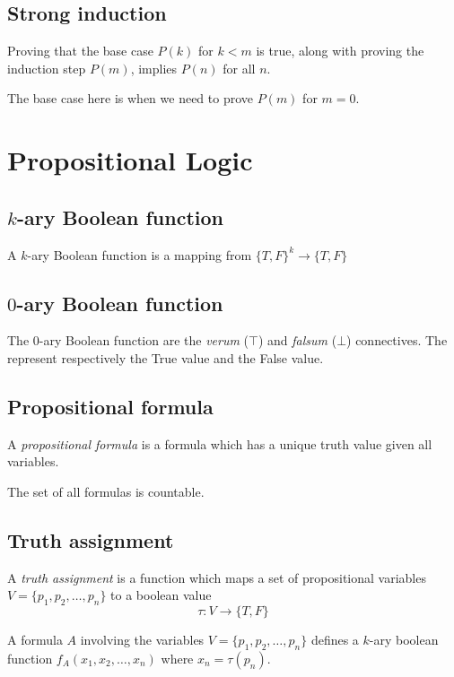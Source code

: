 \documentclass[a4paper]{article}
\begin{document}
\subsection{Strong induction}

Proving that the base case \(P(k)\) for \(k < m\) is true, along with
proving the induction step \(P(m)\), implies \(P(n)\)
for all \(n\).

The base case here is when we need to prove \(P(m)\) for \(m=0\).

\pagebreak

\section{Propositional Logic}

\subsection{\(k\)-ary Boolean function}

A \(k\)-ary Boolean function is a mapping from \({\{T, F\}}^k \to \{T,F\}\)

\subsection{\(0\)-ary Boolean function}

The \(0\)-ary Boolean function are the \textit{verum} (\(\top\)) and \textit{falsum} (\(\bot\)) connectives.
The represent respectively the True value and the False value.

\subsection{Propositional formula}

A \textit{propositional formula} is a formula which has a unique truth value given all variables.

The set of all formulas is countable.

\subsection{Truth assignment}

A \textit{truth assignment} is a function which maps a set of propositional
variables \(V=\{p_1, p_2, \ldots, p_n\}\) to a boolean value
\[
    \tau \colon V \to \{T,F\}
\]

A formula \(A\) involving the variables \(V=\{p_1, p_2, \ldots, p_n\}\)
defines a \(k\)-ary boolean function \(f_A(x_1, x_2, \ldots, x_n)\) where \(x_n = \tau(p_n)\).
\end{document}
